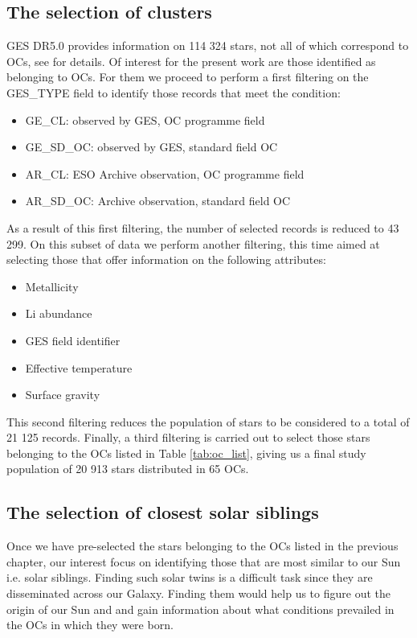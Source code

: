 \documentclass[fleqn,usenatbib]{mnras}
\begin{document}
\subsection{The selection of clusters}
GES DR5.0 provides information on 114 324 stars, not all of which correspond to OCs, see \cite{Gilmore2022} for details. Of interest for the present work are those identified as belonging to OCs. For them we proceed to perform a first filtering on the GES\_TYPE field to identify those records that meet the condition:
\begin{itemize}
    \item GE\_CL: observed by GES, OC programme field
    \item GE\_SD\_OC: observed by GES, standard field OC
    \item AR\_CL: ESO Archive observation, OC programme field
    \item AR\_SD\_OC: Archive observation, standard field OC
\end{itemize}

As a result of this first filtering, the number of selected records is reduced to 43 299. On this subset of data we perform another filtering, this time aimed at selecting those that offer information on the following attributes:
\begin{itemize}
    \item Metallicity
    \item Li abundance
    \item GES field identifier
    \item Effective temperature
    \item Surface gravity
\end{itemize}

This second filtering reduces the population of stars to be considered to a total of 21 125 records. Finally, a third filtering is carried out to select those stars belonging to the OCs listed in Table \ref{tab:oc_list}, giving us a final study population of 20 913 stars distributed in 65 OCs.\par

\subsection{The selection of closest solar siblings}
Once we have pre-selected the stars belonging to the OCs listed in the previous chapter, our interest focus on identifying those that are most similar to our Sun i.e. solar siblings. Finding such solar twins is a difficult task since they are disseminated across our Galaxy. Finding them would help us to figure out the origin of our Sun and and gain information about what conditions prevailed in the OCs in which they were born.\par
\end{document}

